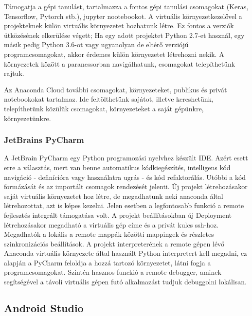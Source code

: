Támogatja a gépi tanulást, tartalmazza a fontos gépi tanulási csomagokat (Keras, Tensorflow, Pytorch stb.), jupyter nootebookot. A virtuális környezetkezelővel a projekteknek külön virtuális környezetet hozhatunk létre. Ez fontos a verziók ütközésének elkerülése végett; Ha egy adott projektet Python 2.7-et használ, egy másik pedig Python 3.6-ot vagy ugyanolyan de eltérő verziójú programcsomagokat, akkor érdemes külön környezetet létrehozni nekik. A környezetek között a parancssorban navigálhatunk, csomagokat telepíthetünk rajtuk.

Az Anaconda Cloud további csomagokat, környezeteket, publikus és privát notebookokat tartalmaz. Ide feltölthetünk sajátot, illetve kereshetünk, telepíthetünk közülük csomagokat, környezeteket a saját gépünkre, környezetünkre.

\subsubsection{JetBrains PyCharm}

A JetBrain PyCharm egy Python programozási nyelvhez készült IDE. Azért esett erre a választás, mert van benne automatikus kódkiegészítés, intelligens kód navigáció - definícióra vagy használatra ugrás - és kód refaktorálás. Utóbbi a kód formázását és az importált csomagok rendezését jelenti.
\newline
\newline
Új projekt létrehozásakor saját virtuális környezetet hoz létre, de megadhatunk neki anaconda által létrehozottat, azt is képes kezelni. Jelen esetben a legfontosabb funkció a remote fejlesztés integrált támogatása volt.
\newline
\newline
A projekt beállításokban új Deployment létrehozásakor megadható a virtuális gép címe és a privát kulcs ssh-hoz. Megadhatók a lokális a remote mappák közötti mappingek és részletes szinkronizációs beállítások. A projekt interpreterének a remote gépen lévő Anaconda virtuális környezete által használt Python interpretert kell megadni, ez alapján a PyCharm feloldja a hozzá tartozó környezetet, látni fogja a programcsomagokat.
\newline
\newline
Szintén hasznos funckió a remote debugger, aminek segítségével a távoli virtuális gépen futó alkalmazást tudjuk debuggolni lokálisan.


\subsection{Android Studio}

